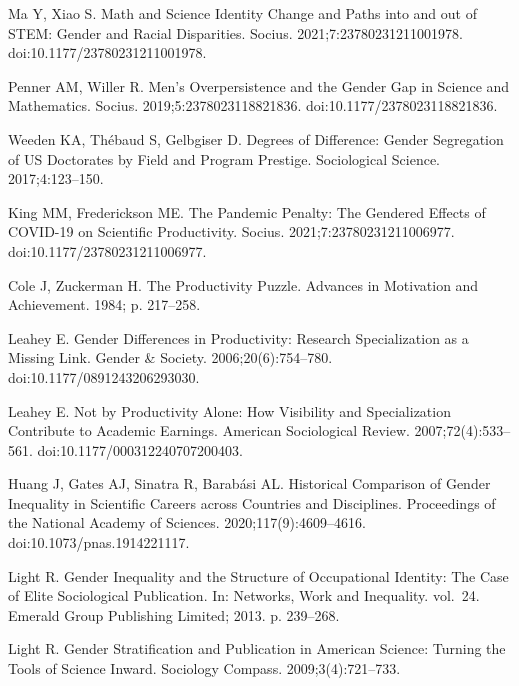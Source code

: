 \documentclass[
  10pt,
  letterpaper,
]{article}
\begin{document}
\begin{thebibliography}{10}
Ma Y, Xiao S.
\newblock Math and {{Science Identity Change}} and {{Paths}} into and out of {{STEM}}: {{Gender}} and {{Racial Disparities}}.
\newblock Socius. 2021;7:23780231211001978.
\newblock doi:{10.1177/23780231211001978}.

Penner AM, Willer R.
\newblock Men's {{Overpersistence}} and the {{Gender Gap}} in {{Science}} and {{Mathematics}}.
\newblock Socius. 2019;5:2378023118821836.
\newblock doi:{10.1177/2378023118821836}.

Weeden KA, Th{\'e}baud S, Gelbgiser D.
\newblock Degrees of Difference: {{Gender}} Segregation of {{US}} Doctorates by Field and Program Prestige.
\newblock Sociological Science. 2017;4:123--150.

King MM, Frederickson ME.
\newblock The {{Pandemic Penalty}}: {{The Gendered Effects}} of {{COVID-19}} on {{Scientific Productivity}}.
\newblock Socius. 2021;7:23780231211006977.
\newblock doi:{10.1177/23780231211006977}.

Cole J, Zuckerman H.
\newblock The {{Productivity Puzzle}}.
\newblock Advances in Motivation and Achievement. 1984; p. 217--258.

Leahey E.
\newblock Gender {{Differences}} in {{Productivity}}: {{Research Specialization}} as a {{Missing Link}}.
\newblock Gender \& Society. 2006;20(6):754--780.
\newblock doi:{10.1177/0891243206293030}.

Leahey E.
\newblock Not by {{Productivity Alone}}: {{How Visibility}} and {{Specialization Contribute}} to {{Academic Earnings}}.
\newblock American Sociological Review. 2007;72(4):533--561.
\newblock doi:{10.1177/000312240707200403}.

Huang J, Gates AJ, Sinatra R, Barab{\'a}si AL.
\newblock Historical Comparison of Gender Inequality in Scientific Careers across Countries and Disciplines.
\newblock Proceedings of the National Academy of Sciences. 2020;117(9):4609--4616.
\newblock doi:{10.1073/pnas.1914221117}.

Light R.
\newblock Gender Inequality and the Structure of Occupational Identity: {{The}} Case of Elite Sociological Publication.
\newblock In: Networks, Work and Inequality. vol.~24. {Emerald Group Publishing Limited}; 2013. p. 239--268.

Light R.
\newblock Gender Stratification and Publication in {{American}} Science: {{Turning}} the Tools of Science Inward.
\newblock Sociology Compass. 2009;3(4):721--733.


\end{thebibliography}
\end{document}
